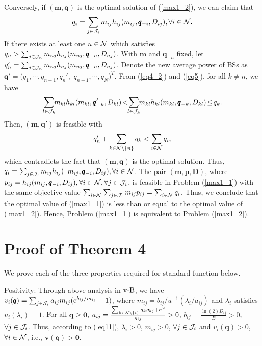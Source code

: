 \documentclass[journal]{IEEEtran}
\begin{document}
Conversely, if $(\pmb{m}, \pmb{q})$ is the optimal solution of (\ref{max1_2}),
we can claim that
\begin{equation}
q_i = \sum_{j \in {\cal{J}}_i } m_{ij} h_{ij}(m_{ij},\pmb{q}_{-i}, D_{ij}), \forall i  \in {\cal{N}}.
\end{equation}
If there exists at least one $n \in {\cal{N}}$ which satisfies $q_n > \sum_{j \in {\cal{J}}_n } m_{nj} h_{nj}(m_{nj},\pmb{q}_{-n}, D_{nj})$.
With $\pmb{m}$ and $\pmb q_{-n}$ fixed, let
$q_n'=\sum_{j \in {\cal{J}}_n } m_{nj} h_{nj}(m_{nj},\pmb{q}_{-n}, D_{nj})$.
Denote the new average power of BSs as $\pmb{q}'=(q_1, \cdots, q_{n-1}, q_n',$ $q_{n+1}, \cdots, q_{N})^T$.
From (\ref{eq4_2}) and (\ref{eq5}),
for all $ k \neq n$, we have
\begin{equation*}
\sum_{l \in {\cal{J}}_k } \!\!m_{kl} h_{kl}(m_{kl},\pmb{q}'_{-k}, D_{kl})\!<\!\!\sum_{l \in {\cal{J}}_k }\! \!m_{kl} h_{kl}(m_{kl},\pmb{q}_{-k}, D_{kl})\!\leq\! q_k.
\end{equation*}
Then, $(\pmb{m}, \pmb{q}')$ is feasible with
\begin{equation}
q_n'+ \sum_{k \in {\cal{N}}\setminus\{n\}} q_k <\sum_{i \in {\cal{N}}} q_i,
\end{equation}
which contradicts the fact that $(\pmb{m, q})$ is the optimal solution.
Thus, $q_i = \sum_{j \in {\cal{J}}_i } m_{ij} h_{ij}($ $m_{ij},\pmb{q}_{-i}, D_{ij}), \forall i  \in {\cal{N}}$.
The pair $(\pmb{m, p, D})$, where $p_{ij}=h_{ij}(m_{ij},\pmb{q}_{-i}, D_{ij}), \forall i  \in {\cal{N}}, \forall j \in {\cal{J}}_i$, is feasible in Problem (\ref{max1_1}) with the same objective value $\sum_{i \in {\cal{N}}}\sum_{j \in {\cal{J}}_i }m_{ij} p_{ij}=\sum_{i \in {\cal{N}}} q_{i}$.
Thus, we conclude that the optimal value of (\ref{max1_1}) is less than or equal to the optimal value of (\ref{max1_2}).
Hence, Problem (\ref{max1_1}) is equivalent to Problem (\ref{max1_2}).

\section{Proof of Theorem 4}
We prove each of the three properties required for standard function below.

Positivity: Through above analysis in $\text{\uppercase\expandafter{\romannumeral5}-B}$,
we have
$v_i(\pmb{q})=\sum_{j \in {\cal{J}}_i }
a_{ij} m_{ij}
(\text e^{b_{ij}/ m_{ij} }-1 )$, where
$m_{ij}={b_{ij}}/ { u^{-1} ( { \lambda_i} /{a_{ij}} )}$
and $\lambda_i$ satisfies $\hat u_i(\lambda_i)=1$.
For all $\pmb{q} \geq \pmb{0}$, $a_{ij}=\frac{\sum_{k \in {\cal{N}}\setminus \{i\}}  q_k g_{kj} +\sigma ^2}
{g_{ij}}>0$, $b_{ij}=\frac {\ln(2)D_{ij}}  {B} >0$, $\forall j \in {\cal{J}}_i$.
Thus, according to (\ref{eq11}), $\lambda_i>0$, $m_{ij}>0$, $\forall j \in {\cal{J}}_i$ and $v_i(\pmb{q})>0$, $\forall i \in {\cal{N}}$, i.e., $\pmb{v}(\pmb{q})>\pmb{0}$.
\end{document}
